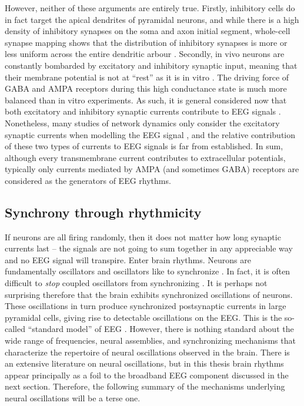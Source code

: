 However, neither of these arguments are entirely true. Firstly, inhibitory cells do in fact target the apical dendrites of pyramidal neurons, and while there is a high density of inhibitory synapses on the soma and axon initial segment, whole-cell synapse mapping shows that the distribution of inhibitory synapses is more or less uniform across the entire dendritic arbour \cite{Iacaruso2017}. Secondly, in vivo neurons are constantly bombarded by excitatory and inhibitory synaptic input, meaning that their membrane potential is not at ``rest'' as it is in vitro \cite{Destexhe2003}. The driving force of GABA and AMPA receptors during this high conductance state is much more balanced than in vitro experiments. As such, it is general considered now that both excitatory and inhibitory synaptic currents contribute to EEG signals \cite{Buzsaki2012}. Nonetheless, many studies of network dynamics only consider the excitatory synaptic currents when modelling the EEG signal \cite{Jensen2005,McCarthy2008}, and the relative contribution of these two types of currents to EEG signals is far from established. In sum, although every transmembrane current contributes to extracellular potentials, typically only currents mediated by AMPA (and sometimes GABA) receptors are considered as the generators of EEG rhythms.

\subsection{Synchrony through rhythmicity}
If neurons are all firing randomly, then it does not matter how long synaptic currents last -- the signals are not going to sum together in any appreciable way and no EEG signal will transpire. Enter brain rhythms. Neurons are fundamentally oscillators \cite{HODGKIN1952} and oscillators like to synchronize \cite{Strogatz2015}. In fact, it is often difficult to \textit{stop} coupled oscillators from synchronizing \cite{Erb1992}. It is perhaps not surprising therefore that the brain exhibits synchronized oscillations of neurons. These oscillations in turn produce synchronized postsynaptic currents in large pyramidal cells, giving rise to detectable oscillations on the EEG. This is the so-called ``standard model'' of EEG \cite{Cohen2017}. However, there is nothing standard about the wide range of frequencies, neural assemblies, and synchronizing mechanisms that characterize the repertoire of neural oscillations observed in the brain.  There is an extensive literature on neural oscillations, but in this thesis brain rhythms appear principally as a foil to the broadband EEG component discussed in the next section. Therefore, the following summary of the mechanisms underlying neural oscillations will be a terse one.

